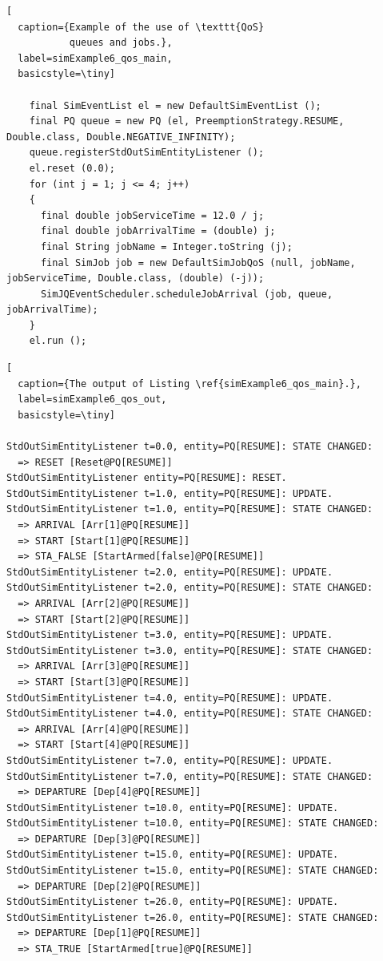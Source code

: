 \documentclass[12pt]{book}
\begin{document}
\begin{lstfloat}
\begin{lstlisting}[
  caption={Example of the use of \texttt{QoS}
           queues and jobs.},
  label=simExample6_qos_main,
  basicstyle=\tiny]

    final SimEventList el = new DefaultSimEventList ();
    final PQ queue = new PQ (el, PreemptionStrategy.RESUME, Double.class, Double.NEGATIVE_INFINITY);
    queue.registerStdOutSimEntityListener ();
    el.reset (0.0);
    for (int j = 1; j <= 4; j++)
    {
      final double jobServiceTime = 12.0 / j;
      final double jobArrivalTime = (double) j;
      final String jobName = Integer.toString (j);
      final SimJob job = new DefaultSimJobQoS (null, jobName, jobServiceTime, Double.class, (double) (-j));
      SimJQEventScheduler.scheduleJobArrival (job, queue, jobArrivalTime);
    }
    el.run ();

\end{lstlisting}
\end{lstfloat}

\begin{lstfloat}
\begin{lstlisting}[
  caption={The output of Listing \ref{simExample6_qos_main}.},
  label=simExample6_qos_out,
  basicstyle=\tiny]

StdOutSimEntityListener t=0.0, entity=PQ[RESUME]: STATE CHANGED:
  => RESET [Reset@PQ[RESUME]]
StdOutSimEntityListener entity=PQ[RESUME]: RESET.
StdOutSimEntityListener t=1.0, entity=PQ[RESUME]: UPDATE.
StdOutSimEntityListener t=1.0, entity=PQ[RESUME]: STATE CHANGED:
  => ARRIVAL [Arr[1]@PQ[RESUME]]
  => START [Start[1]@PQ[RESUME]]
  => STA_FALSE [StartArmed[false]@PQ[RESUME]]
StdOutSimEntityListener t=2.0, entity=PQ[RESUME]: UPDATE.
StdOutSimEntityListener t=2.0, entity=PQ[RESUME]: STATE CHANGED:
  => ARRIVAL [Arr[2]@PQ[RESUME]]
  => START [Start[2]@PQ[RESUME]]
StdOutSimEntityListener t=3.0, entity=PQ[RESUME]: UPDATE.
StdOutSimEntityListener t=3.0, entity=PQ[RESUME]: STATE CHANGED:
  => ARRIVAL [Arr[3]@PQ[RESUME]]
  => START [Start[3]@PQ[RESUME]]
StdOutSimEntityListener t=4.0, entity=PQ[RESUME]: UPDATE.
StdOutSimEntityListener t=4.0, entity=PQ[RESUME]: STATE CHANGED:
  => ARRIVAL [Arr[4]@PQ[RESUME]]
  => START [Start[4]@PQ[RESUME]]
StdOutSimEntityListener t=7.0, entity=PQ[RESUME]: UPDATE.
StdOutSimEntityListener t=7.0, entity=PQ[RESUME]: STATE CHANGED:
  => DEPARTURE [Dep[4]@PQ[RESUME]]
StdOutSimEntityListener t=10.0, entity=PQ[RESUME]: UPDATE.
StdOutSimEntityListener t=10.0, entity=PQ[RESUME]: STATE CHANGED:
  => DEPARTURE [Dep[3]@PQ[RESUME]]
StdOutSimEntityListener t=15.0, entity=PQ[RESUME]: UPDATE.
StdOutSimEntityListener t=15.0, entity=PQ[RESUME]: STATE CHANGED:
  => DEPARTURE [Dep[2]@PQ[RESUME]]
StdOutSimEntityListener t=26.0, entity=PQ[RESUME]: UPDATE.
StdOutSimEntityListener t=26.0, entity=PQ[RESUME]: STATE CHANGED:
  => DEPARTURE [Dep[1]@PQ[RESUME]]
  => STA_TRUE [StartArmed[true]@PQ[RESUME]]

\end{lstlisting}
\end{lstfloat}
\end{document}
